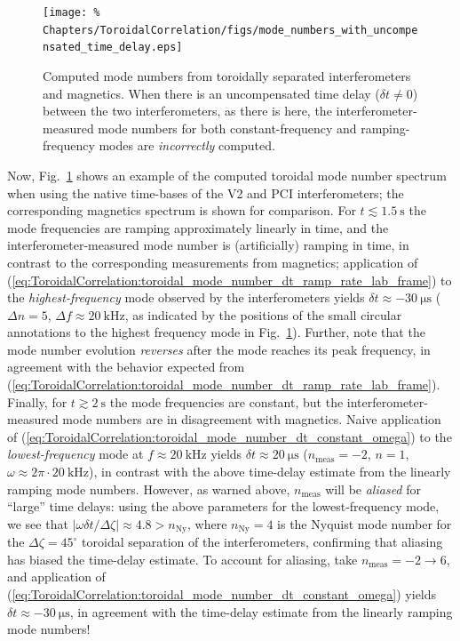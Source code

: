 \begin{figure}
  \centering
  \texttt{[image: \%
    Chapters/ToroidalCorrelation/figs/mode\_numbers\_with\_uncompensated\_time\_delay.eps]}
  \caption{Computed mode numbers from
    toroidally separated interferometers and magnetics.
    When there is an uncompensated time delay ($\delta t \neq 0$)
    between the two interferometers, as there is here,
    the interferometer-measured mode numbers
    for both constant-frequency and ramping-frequency modes
    are \emph{incorrectly} computed.}
\label{fig:ToroidalCorrelation:uncompensated_time_delay}
\end{figure}

\graffito{\textcolor{red}{Improve discussion of two estimates}}
Now, Fig.~\ref{fig:ToroidalCorrelation:uncompensated_time_delay} shows an example
of the computed toroidal mode number spectrum
when using the native time-bases of the V2 and PCI interferometers;
the corresponding magnetics spectrum is shown for comparison.
For $t \lesssim \SI{1.5}{\second}$
the mode frequencies are ramping approximately linearly in time, and
the interferometer-measured mode number is (artificially) ramping in time,
in contrast to the corresponding measurements from magnetics;
application of
(\ref{eq:ToroidalCorrelation:toroidal_mode_number_dt_ramp_rate_lab_frame})
to the \emph{highest-frequency} mode observed by the interferometers yields
$\delta t \approx \SI{-30}{\micro\second}$
($\Delta n = 5$, $\Delta f \approx \SI{20}{\kilo\hertz}$,
as indicated by the positions of the small circular annotations
to the highest frequency mode in
Fig.~\ref{fig:ToroidalCorrelation:uncompensated_time_delay}).
Further, note that the mode number evolution \emph{reverses}
after the mode reaches its peak frequency,
in agreement with the behavior expected from
(\ref{eq:ToroidalCorrelation:toroidal_mode_number_dt_ramp_rate_lab_frame}).
Finally, for $t \gtrsim \SI{2}{\second}$
the mode frequencies are constant, but
the interferometer-measured mode numbers are in disagreement with magnetics.
Naive application of
(\ref{eq:ToroidalCorrelation:toroidal_mode_number_dt_constant_omega})
to the \emph{lowest-frequency} mode at $f \approx \SI{20}{\kilo\hertz}$
yields $\delta t \approx \SI{20}{\micro\second}$
($n_{\text{meas}} = -2$, $n = 1$,
$\omega \approx 2 \pi \cdot \SI{20}{\kilo\hertz}$),
in contrast with the above time-delay estimate
from the linearly ramping mode numbers.
However, as warned above,
$n_{\text{meas}}$ will be \emph{aliased} for ``large'' time delays:
using the above parameters for the lowest-frequency mode,
we see that $|\omega \delta t / \Delta \zeta| \approx 4.8 > n_{\text{Ny}}$,
where $n_{\text{Ny}} = 4$ is the Nyquist mode number
for the $\Delta \zeta = 45^{\circ}$ toroidal separation of the interferometers,
confirming that aliasing has biased the time-delay estimate.
To account for aliasing, take $n_{\text{meas}} = -2 \rightarrow 6$, and
application of
(\ref{eq:ToroidalCorrelation:toroidal_mode_number_dt_constant_omega}) yields
$\delta t \approx -\SI{30}{\micro\second}$,
in agreement with the time-delay estimate
from the linearly ramping mode numbers!

